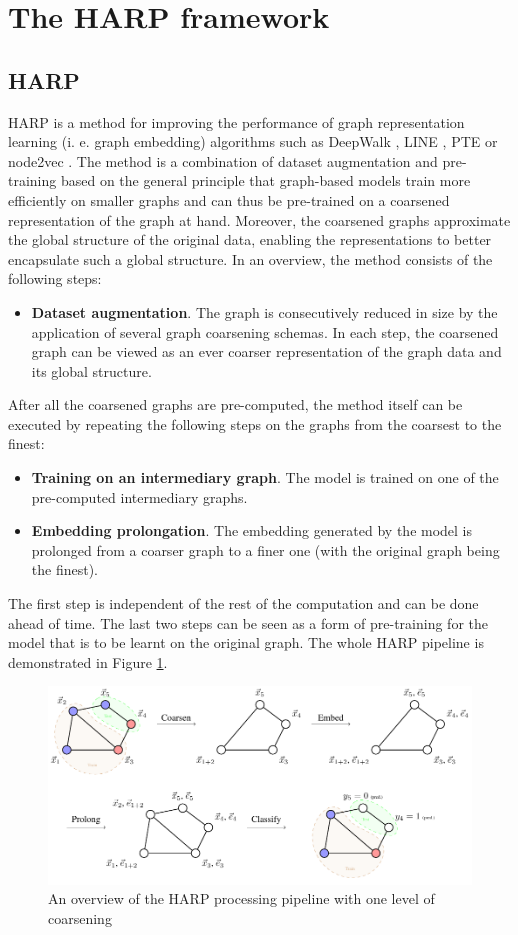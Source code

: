\section{The HARP framework}

\subsection{HARP}
HARP is a method for improving the performance of graph representation learning (i. e. graph embedding) algorithms such as DeepWalk \cite{perozzi_deepwalk_2014}, LINE \cite{tang_line_2015}, PTE \cite{tang_pte_2015} or node2vec \cite{grover_node2vec_2016}. The method is a combination of dataset augmentation and pre-training based on the general principle that graph-based models train more efficiently on smaller graphs and can thus be pre-trained on a coarsened representation of the graph at hand. Moreover, the coarsened graphs approximate the global structure of the original data, enabling the representations to better encapsulate such a global structure. In an overview, the method consists of the following steps:

\begin{itemize}
  \item \textbf{Dataset augmentation}. The graph is consecutively reduced in size by the application of several graph coarsening schemas. In each step, the coarsened graph can be viewed as an ever coarser representation of the graph data and its global structure.
\end{itemize}
After all the coarsened graphs are pre-computed, the method itself can be executed by repeating the following steps on the graphs from the coarsest to the finest:
\begin{itemize}
  \item \textbf{Training on an intermediary graph}. The model is trained on one of the pre-computed intermediary graphs.
  \item \textbf{Embedding prolongation}. The embedding generated by the model is prolonged from a coarser graph to a finer one (with the original graph being the finest).
\end{itemize}

The first step is independent of the rest of the computation and can be done ahead of time. The last two steps can be seen as a form of pre-training for the model that is to be learnt on the original graph. The whole HARP pipeline is demonstrated in Figure \ref{fig:harp-overview}.

\begin{figure}
  \centering
  \includegraphics[width=\linewidth]{images/harp-overview/harp-overview.pdf}
  \caption{An overview of the HARP processing pipeline with one level of coarsening}
  \label{fig:harp-overview}
\end{figure}
